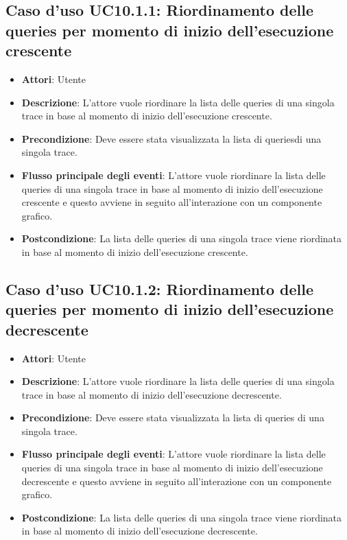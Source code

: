 \subsection{Caso d'uso UC10.1.1: Riordinamento delle queries per momento di inizio dell'esecuzione crescente}
\begin{itemize}
\item \textbf{Attori}: Utente
\item \textbf{Descrizione}: L'attore vuole riordinare la lista delle queries di una singola trace in base al momento di inizio dell'esecuzione crescente.
\item \textbf{Precondizione}: Deve essere stata visualizzata la lista di queriesdi una singola trace.
\item \textbf{Flusso principale degli eventi}: L'attore vuole riordinare la lista delle queries di una singola trace in base al momento di inizio dell'esecuzione crescente e questo avviene in seguito all'interazione con un componente grafico.
\item \textbf{Postcondizione}: La lista delle queries di una singola trace viene riordinata in base al momento di inizio dell'esecuzione crescente.
\end{itemize}
\subsection{Caso d'uso UC10.1.2: Riordinamento delle queries per momento di inizio dell'esecuzione decrescente}
\begin{itemize}
\item \textbf{Attori}: Utente
\item \textbf{Descrizione}: L'attore vuole riordinare la lista delle queries di una singola trace in base al momento di inizio dell'esecuzione decrescente.
\item \textbf{Precondizione}: Deve essere stata visualizzata la lista di queries di una singola trace.
\item \textbf{Flusso principale degli eventi}: L'attore vuole riordinare la lista delle queries di una singola trace in base al momento di inizio dell'esecuzione decrescente e questo avviene in seguito all'interazione con un componente grafico.
\item \textbf{Postcondizione}: La lista delle queries di una singola trace viene riordinata in base al momento di inizio dell'esecuzione decrescente.
\end{itemize}
